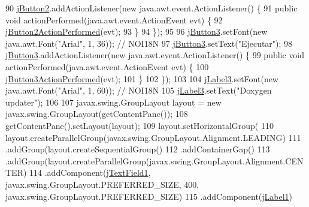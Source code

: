 \begin{DoxyCode}
90         \mbox{\hyperlink{classactualizadordoxy_1_1ventana_principal_a2cf13d88ffb8e10bbc41bf5d690bd6fe}{jButton2}}.addActionListener(\textcolor{keyword}{new} java.awt.event.ActionListener() \{
91             \textcolor{keyword}{public} \textcolor{keywordtype}{void} actionPerformed(java.awt.event.ActionEvent evt) \{
92                 \mbox{\hyperlink{classactualizadordoxy_1_1ventana_principal_ad80963b7f354d80ffa69e7e6cadba390}{jButton2ActionPerformed}}(evt);
93             \}
94         \});
95 
96         \mbox{\hyperlink{classactualizadordoxy_1_1ventana_principal_a228eef1536949c06fd4cfef1fe9b97b8}{jButton3}}.setFont(\textcolor{keyword}{new} java.awt.Font(\textcolor{stringliteral}{"Arial"}, 1, 36)); \textcolor{comment}{// NOI18N}
97         \mbox{\hyperlink{classactualizadordoxy_1_1ventana_principal_a228eef1536949c06fd4cfef1fe9b97b8}{jButton3}}.setText(\textcolor{stringliteral}{"Ejecutar"});
98         \mbox{\hyperlink{classactualizadordoxy_1_1ventana_principal_a228eef1536949c06fd4cfef1fe9b97b8}{jButton3}}.addActionListener(\textcolor{keyword}{new} java.awt.event.ActionListener() \{
99             \textcolor{keyword}{public} \textcolor{keywordtype}{void} actionPerformed(java.awt.event.ActionEvent evt) \{
100                 \mbox{\hyperlink{classactualizadordoxy_1_1ventana_principal_a714f4ea7e27667dfa242c579a2fdf6f1}{jButton3ActionPerformed}}(evt);
101             \}
102         \});
103 
104         \mbox{\hyperlink{classactualizadordoxy_1_1ventana_principal_a7581b585f39de6258b08299571546229}{jLabel3}}.setFont(\textcolor{keyword}{new} java.awt.Font(\textcolor{stringliteral}{"Arial"}, 1, 60)); \textcolor{comment}{// NOI18N}
105         \mbox{\hyperlink{classactualizadordoxy_1_1ventana_principal_a7581b585f39de6258b08299571546229}{jLabel3}}.setText(\textcolor{stringliteral}{"Doxygen updater"});
106 
107         javax.swing.GroupLayout layout = \textcolor{keyword}{new} javax.swing.GroupLayout(getContentPane());
108         getContentPane().setLayout(layout);
109         layout.setHorizontalGroup(
110             layout.createParallelGroup(javax.swing.GroupLayout.Alignment.LEADING)
111             .addGroup(layout.createSequentialGroup()
112                 .addContainerGap()
113                 .addGroup(layout.createParallelGroup(javax.swing.GroupLayout.Alignment.CENTER)
114                     .addComponent(\mbox{\hyperlink{classactualizadordoxy_1_1ventana_principal_a0e2df794c32f58c41675cd579e38b5d0}{jTextField1}}, javax.swing.GroupLayout.PREFERRED\_SIZE, 400, 
      javax.swing.GroupLayout.PREFERRED\_SIZE)
115                     .addComponent(\mbox{\hyperlink{classactualizadordoxy_1_1ventana_principal_aa119cc780acbfdd1f1dc1fa1899136f4}{jLabel1}})

\end{DoxyCode}

